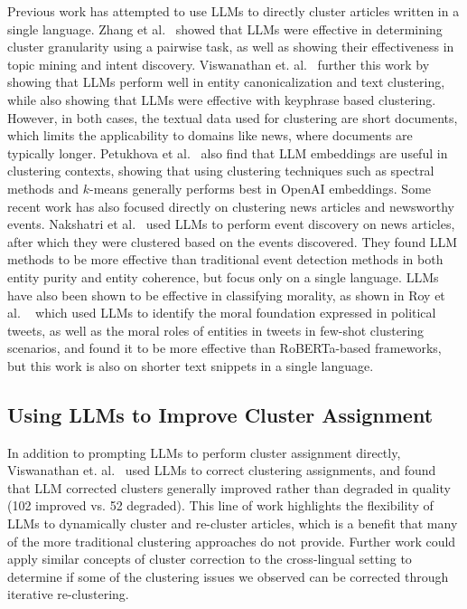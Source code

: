 Previous work has attempted to use LLMs to directly cluster articles written in a single language. 
Zhang et al.~\cite{Zhang2023clusterllm} showed that LLMs were effective in determining cluster granularity using a pairwise task, as well as showing their effectiveness in topic mining and intent discovery. 
Viswanathan et. al.~\cite{Viswanathan2024} further this work by showing that LLMs perform well in entity canonicalization and text clustering, while also showing that LLMs were effective with keyphrase based clustering. 
However, in both cases, the textual data used for clustering are short documents, which limits the applicability to domains like news, where documents are typically longer.
Petukhova et al.~\cite{petukhova2024textclusteringllmembeddings} also find that LLM embeddings are useful in clustering contexts, showing that using clustering techniques such as spectral methods and $k$-means generally performs best in OpenAI embeddings. 
Some recent work has also focused directly on clustering news articles and newsworthy events.
Nakshatri et al.~\cite{NakshatriEtal2023NewsSummaries} used LLMs to perform event discovery on news articles, after which they were clustered based on the events discovered. 
They found LLM methods to be more effective than traditional event detection methods in both entity purity and entity coherence, but focus only on a single language.
LLMs have also been shown to be effective in classifying morality, as shown in Roy et al. ~\cite{RoyEtal2022Morality} which used LLMs to identify the moral foundation expressed in political tweets, as well as the moral roles of entities in tweets in few-shot clustering scenarios, and found it to be more effective than RoBERTa-based frameworks, but this work is also on shorter text snippets in a single language. 

\subsection{Using LLMs to Improve Cluster Assignment}

In addition to prompting LLMs to perform cluster assignment directly, Viswanathan et. al.~\cite{Viswanathan2024} used LLMs to correct clustering assignments, and found that LLM corrected clusters generally improved rather than degraded in quality (102 improved vs. 52 degraded).
This line of work highlights the flexibility of LLMs to dynamically cluster and re-cluster articles, which is a benefit that many of the more traditional clustering approaches do not provide.
Further work could apply similar concepts of cluster correction to the cross-lingual setting to determine if some of the clustering issues we observed can be corrected through iterative re-clustering.

